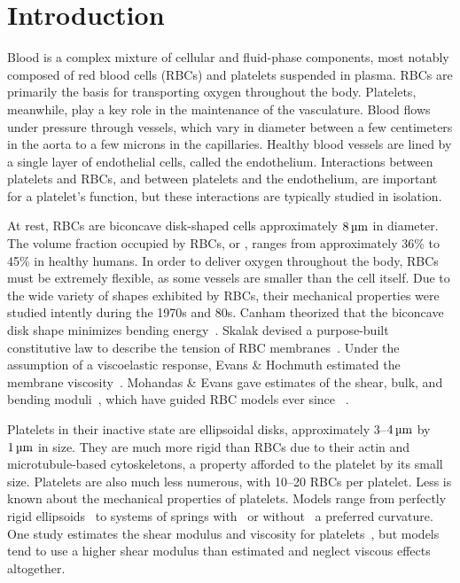 \section{Introduction}

Blood is a complex mixture of cellular and fluid-phase components, most notably composed
of red blood cells (RBCs) and platelets suspended in plasma. RBCs are primarily the basis
for transporting oxygen throughout the body. Platelets, meanwhile, play a key role in the
maintenance of the vasculature. Blood flows under pressure through vessels, which vary in
diameter between a few centimeters in the aorta to a few microns in the capillaries.
Healthy blood vessels are lined by a single layer of endothelial cells, called the
endothelium.  Interactions between platelets and RBCs, and between platelets and the
endothelium, are important for a platelet's function, but these interactions are
typically studied in isolation.

At rest, RBCs are biconcave disk-shaped cells approximately $8\um$ in diameter. The
volume fraction occupied by RBCs, or , ranges from approximately 36\% to
45\% in healthy humans. In order to deliver oxygen throughout the body, RBCs must be
extremely flexible, as some vessels are smaller than the cell itself. Due to the wide
variety of shapes exhibited by RBCs, their mechanical properties were studied intently
during the 1970s and 80s. Canham theorized that the biconcave disk shape minimizes
bending energy~\cite{Canham:1970wx}. Skalak  devised a purpose-built
constitutive law to describe the tension of RBC membranes~\cite{Skalak:1973tp}. Under the
assumption of a viscoelastic response, Evans \& Hochmuth estimated the membrane
viscosity~\cite{Evans:1976tx}. Mohandas \& Evans gave estimates of the shear, bulk, and
bending moduli~\cite{Mohandas:1994tg}, which have guided RBC models ever since~%
\cite{Pozrikidis:2003ft,Fai:2013do}.

Platelets in their inactive state are ellipsoidal disks, approximately 3--$4\um$ by
$1\um$ in size. They are much more rigid than RBCs due to their actin and
microtubule-based cytoskeletons, a property afforded to the platelet by its small size.
Platelets are also much less numerous, with 10--20 RBCs per platelet. Less is known about
the mechanical properties of platelets. Models range from perfectly rigid ellipsoids~%
\cite{Wang:2013gs} to systems of springs with~\cite{Erickson:2010ep,Skorczewski:2013jn}
or without~\cite{Wu:2014gt} a preferred curvature. One study estimates the shear modulus
and viscosity for platelets~\cite{Haga:1998wa}, but models tend to use a higher shear
modulus than estimated and neglect viscous effects altogether.

